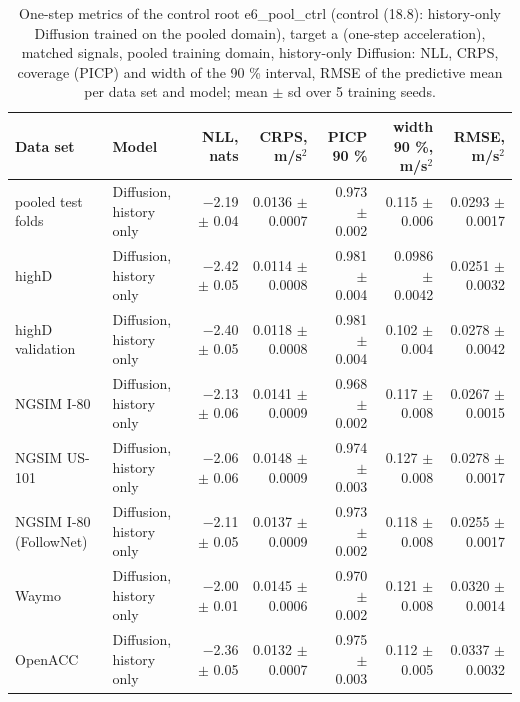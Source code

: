 \begin{table}[htbp]
\centering
\footnotesize
\caption{One-step metrics of the control root e6\_pool\_ctrl (control (18.8): history-only Diffusion trained on the pooled domain), target a (one-step acceleration), matched signals, pooled training domain, history-only Diffusion: NLL, CRPS, coverage (PICP) and width of the 90 \% interval, RMSE of the predictive mean per data set and model; mean $\pm$ sd over 5 training seeds.}
\label{tab:t1-one-step--pool-ctrl--a}
\begin{tabular}{llrrrrr}
\toprule
Data set & Model & NLL, nats & CRPS, m/s$^2$ & PICP 90 \% & width 90 \%, m/s$^2$ & RMSE, m/s$^2$ \\
\midrule
pooled test folds & Diffusion, history only & $-$2.19 $\pm$ 0.04 & 0.0136 $\pm$ 0.0007 & 0.973 $\pm$ 0.002 & 0.115 $\pm$ 0.006 & 0.0293 $\pm$ 0.0017 \\
\midrule
highD & Diffusion, history only & $-$2.42 $\pm$ 0.05 & 0.0114 $\pm$ 0.0008 & 0.981 $\pm$ 0.004 & 0.0986 $\pm$ 0.0042 & 0.0251 $\pm$ 0.0032 \\
\midrule
highD validation & Diffusion, history only & $-$2.40 $\pm$ 0.05 & 0.0118 $\pm$ 0.0008 & 0.981 $\pm$ 0.004 & 0.102 $\pm$ 0.004 & 0.0278 $\pm$ 0.0042 \\
\midrule
NGSIM I-80 & Diffusion, history only & $-$2.13 $\pm$ 0.06 & 0.0141 $\pm$ 0.0009 & 0.968 $\pm$ 0.002 & 0.117 $\pm$ 0.008 & 0.0267 $\pm$ 0.0015 \\
\midrule
NGSIM US-101 & Diffusion, history only & $-$2.06 $\pm$ 0.06 & 0.0148 $\pm$ 0.0009 & 0.974 $\pm$ 0.003 & 0.127 $\pm$ 0.008 & 0.0278 $\pm$ 0.0017 \\
\midrule
NGSIM I-80 (FollowNet) & Diffusion, history only & $-$2.11 $\pm$ 0.05 & 0.0137 $\pm$ 0.0009 & 0.973 $\pm$ 0.002 & 0.118 $\pm$ 0.008 & 0.0255 $\pm$ 0.0017 \\
\midrule
Waymo & Diffusion, history only & $-$2.00 $\pm$ 0.01 & 0.0145 $\pm$ 0.0006 & 0.970 $\pm$ 0.002 & 0.121 $\pm$ 0.008 & 0.0320 $\pm$ 0.0014 \\
\midrule
OpenACC & Diffusion, history only & $-$2.36 $\pm$ 0.05 & 0.0132 $\pm$ 0.0007 & 0.975 $\pm$ 0.003 & 0.112 $\pm$ 0.005 & 0.0337 $\pm$ 0.0032 \\
\bottomrule
\end{tabular}
\end{table}
